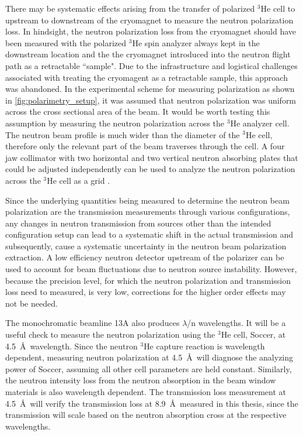 There may be systematic effects arising from the transfer of polarized $^3$He cell to upstream to downstream of the cryomagnet to measure the neutron polarization loss. In hindsight, the neutron polarization loss from the cryomagnet should have been measured with the polarized $^3$He spin analyzer always kept in the downstream location and the the cryomagnet introduced into the neutron flight path as a retractable ``sample". Due to the infrastructure and logistical challenges associated with treating the cryomagent as a retractable sample, this approach was abandoned. In the experimental scheme for measuring polarization as shown in \cref{fig:polarimetry_setup}, it was assumed that neutron polarization was uniform across the cross sectional area of the beam. It would be worth testing this assumption by measuring the neutron polarization across the $^3$He analyzer cell. The neutron beam profile is much wider than the diameter of the $^3$He cell, therefore only the relevant part of the beam traverses through the cell. A four jaw collimator with two horizontal and two vertical neutron absorbing plates that could be adjusted independently can be used to analyze the neutron polarization across the $^3$He cell as a grid \cite{McCrea2020}.

Since the underlying quantities being measured to determine the neutron beam polarization are the transmission measurements through various configurations, any changes in neutron transmission from sources other than the intended configuration setup can lead to a systematic shift in the actual transmission and subsequently, cause a systematic uncertainty in the neutron beam polarization extraction. A low efficiency neutron detector upstream of the polarizer can be used to account for beam fluctuations due to neutron source instability. However, because the precision level, for which the neutron polarization and transmission loss need to measured, is very low, corrections for the higher order effects may not be needed.

The monochromatic beamline 13A also produces $\lambda$/n wavelengths. It will be a useful check to measure the neutron polarization using the $^3$He cell, Soccer, at 4.5~\AA\ wavelength. Since the neutron $^3$He capture reaction is wavelength dependent, measuring neutron polarization at 4.5~\AA\ will diagnose the analyzing power of Soccer, assuming all other cell parameters are held constant. Similarly, the neutron intensity loss from the neutron absorption in the beam window materials is also wavelength dependent. The transmission loss measurement at 4.5~\AA\ will verify the transmission loss at 8.9~\AA\ measured in this thesis, since the transmission will scale based on the neutron absorption cross at the respective wavelengths.  


